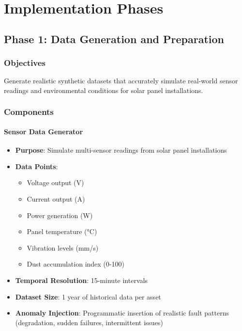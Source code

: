 \documentclass[12pt,a4paper]{article}
\begin{document}
\newpage

\section{Implementation Phases}

\subsection{Phase 1: Data Generation and Preparation}

\subsubsection{Objectives}
Generate realistic synthetic datasets that accurately simulate real-world sensor readings and environmental conditions for solar panel installations.

\subsubsection{Components}

\paragraph{Sensor Data Generator}
\begin{itemize}[leftmargin=*]
    \item \textbf{Purpose}: Simulate multi-sensor readings from solar panel installations
    \item \textbf{Data Points}:
    \begin{itemize}
        \item Voltage output (V)
        \item Current output (A)
        \item Power generation (W)
        \item Panel temperature (°C)
        \item Vibration levels (mm/s)
        \item Dust accumulation index (0-100)
    \end{itemize}
    \item \textbf{Temporal Resolution}: 15-minute intervals
    \item \textbf{Dataset Size}: 1 year of historical data per asset
    \item \textbf{Anomaly Injection}: Programmatic insertion of realistic fault patterns (degradation, sudden failures, intermittent issues)
\end{itemize}
\end{document}
